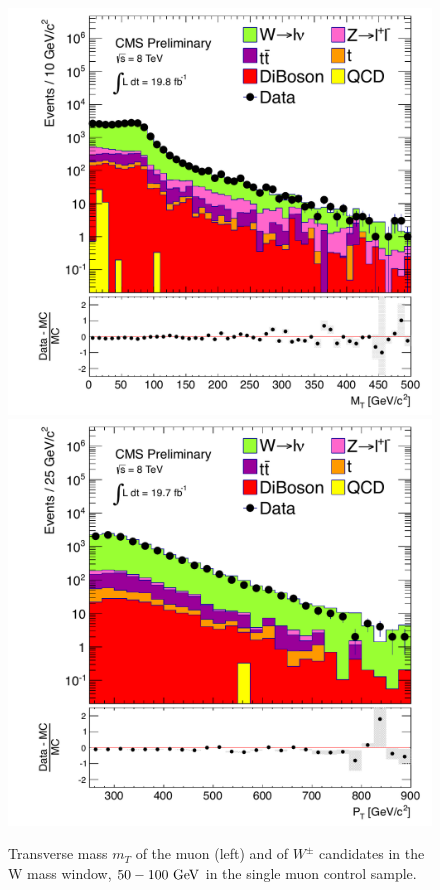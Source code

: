 \begin{figure}[!Hhtb]
  \begin{center}
  \includegraphics[scale=0.39]{Figures/sus13009/cut/WlepnuMT_prelim.pdf}
  \includegraphics[scale=0.39]{Figures/sus13009/cut/WlepnuPT2_50_100_prelim.pdf}
  \caption{Transverse mass $m_{T}$ of the muon (left) and \pt{} of $W^\pm$ candidates in the W mass window, $50 - 100~\mathrm{GeV}$ in the single muon control sample.}
  \label{fig:BKGR_W_mass}
  \end{center}
\end{figure}

